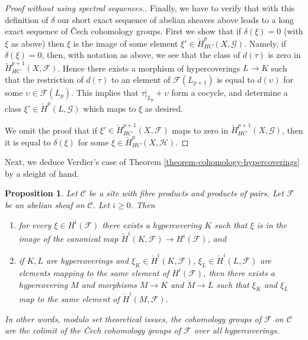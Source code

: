 \documentclass[10pt,a4paper]{article}
\theoremstyle{plain}
\newtheorem{proposition}[subsection]{Proposition}
\theoremstyle{definition}
\theoremstyle{remark}
\numberwithin{equation}{subsection}
\begin{document}
\begin{proof}[Proof without using spectral sequences.]
\medskip\noindent
Finally, we have to verify that with this definition of $\delta$
our short exact sequence of abelian sheaves above leads to a
long exact sequence of {\v C}ech cohomology groups.
First we show that if $\delta(\xi) = 0$ (with $\xi$ as above) then
$\xi$ is the image of some element
$\xi' \in \check{H}^p_{HC}(X, \mathcal{G})$.
Namely, if $\delta(\xi) = 0$, then, with notation as above, we
see that the class of $d(\tau)$ is zero in
$\check{H}^{p + 1}_{HC}(X, \mathcal{F})$. Hence there exists
a morphism of hypercoverings $L \to K$ such that the restriction
of $d(\tau)$ to an element of $\mathcal{F}(L_{p + 1})$ is
equal to $d(\upsilon)$ for some $\upsilon \in \mathcal{F}(L_p)$.
This implies that $\tau|_{L_p} + \upsilon$ form a
cocycle, and determine a class $\xi' \in \check{H}^p(L, \mathcal{G})$
which maps to $\xi$ as desired.

\medskip\noindent
We omit the proof that if $\xi' \in \check{H}^{p + 1}_{HC}(X, \mathcal{F})$
maps to zero in $\check{H}^{p + 1}_{HC}(X, \mathcal{G})$, then it is
equal to $\delta(\xi)$ for some $\xi \in \check{H}^p_{HC}(X, \mathcal{H})$.
\end{proof}

\noindent
Next, we deduce Verdier's case of
Theorem \ref{theorem-cohomology-hypercoverings}
by a sleight of hand.

\begin{proposition}
\label{proposition-cohomology-hypercoverings}
Let $\mathcal{C}$ be a site with fibre products and products of pairs.
Let $\mathcal{F}$ be an abelian sheaf on $\mathcal{C}$.
Let $i \geq 0$. Then
\begin{enumerate}
\item for every $\xi \in H^i(\mathcal{F})$ there exists a hypercovering
$K$ such that $\xi$ is in the image of the canonical map
$\check{H}^i(K, \mathcal{F}) \to H^i(\mathcal{F})$, and
\item if $K, L$ are hypercoverings and $\xi_K \in \check{H}^i(K, \mathcal{F})$,
$\xi_L \in \check{H}^i(L, \mathcal{F})$ are elements mapping
to the same element of $H^i(\mathcal{F})$, then there exists
a hypercovering $M$ and morphisms $M \to K$ and $M \to L$ such
that $\xi_K$ and $\xi_L$ map to the same element of
$\check{H}^i(M, \mathcal{F})$.
\end{enumerate}
In other words, modulo set theoretical issues, the cohomology
groups of $\mathcal{F}$ on $\mathcal{C}$ are the colimit of
the {\v C}ech cohomology groups of $\mathcal{F}$ over all hypercoverings.
\end{proposition}
\end{document}
